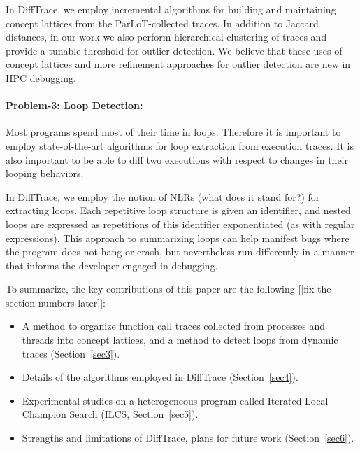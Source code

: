 In DiffTrace, we employ incremental algorithms for building and maintaining
concept lattices from the ParLoT-collected traces.
%
In addition to Jaccard distances, in our work we also perform hierarchical
clustering of traces and provide a tunable threshold for outlier detection.
%
We believe that these uses of concept lattices and more refinement approaches
for outlier detection are new in HPC debugging.


\paragraph{Problem-3: Loop Detection:\/}
Most programs spend most of their time in loops.
%
Therefore it is important to employ state-of-the-art algorithms for
loop extraction from execution traces.
%
It is also important
to be able to diff two executions with respect to changes in their looping behaviors.

In DiffTrace, we employ the notion of NLRs (what does it stand for?) for
extracting loops.
%
Each repetitive loop structure is given an identifier, and nested loops are
expressed as repetitions of this identifier exponentiated (as with regular
expressions).
%
This approach to summarizing loops can help manifest
bugs where the program does not hang or crash, but nevertheless
run differently in a manner that informs the developer engaged in debugging.


\noindent To summarize, the key contributions of this paper are the following [[fix the section numbers
later]]:

\begin{itemize}
\item A method to organize function call traces collected from processes and
      threads into concept lattices, and a method to
      detect loops from dynamic traces (Section~\ref{sec3}).

\item Details of the algorithms employed in DiffTrace (Section~\ref{sec4}).

\item Experimental studies on a heterogeneous program called
      Iterated Local Champion Search (ILCS, Section~\ref{sec5}).

\item Strengths and limitations of DiffTrace, plans for future work (Section~\ref{sec6}).
\end{itemize}



